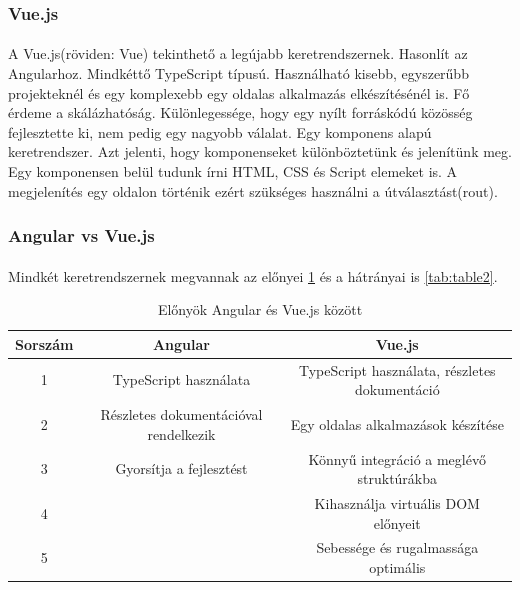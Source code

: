 \documentclass{article}
\begin{document}
	\subsubsection{Vue.js}
	\paragraph{}
	A Vue.js(röviden: Vue) tekinthető a legújabb keretrendszernek. Hasonlít az Angularhoz. Mindkéttő TypeScript típusú. Használható kisebb, egyszerűbb projekteknél és egy komplexebb egy oldalas alkalmazás elkészítésénél is. Fő érdeme a skálázhatóság. Különlegessége, hogy egy nyílt forráskódú közösség fejlesztette ki, nem pedig egy nagyobb válalat. Egy komponens alapú keretrendszer. Azt jelenti, hogy komponenseket különböztetünk és jelenítünk meg. Egy komponensen belül tudunk írni HTML, CSS és Script elemeket is. A megjelenítés egy oldalon történik ezért szükséges használni a útválasztást(rout).\cite{wohlgethan2018supportingweb}
	
	\subsubsection{Angular vs Vue.js}
	\paragraph{}
	Mindkét keretrendszernek megvannak az előnyei \ref{tab:table1} és a hátrányai is \ref{tab:table2}. 
	\begin{table}
		\begin{center}
			\caption{Előnyök Angular és Vue.js között \cite{vuevsang} }
			\label{tab:table1}
			\begin{tabular}{c|c|c} 
				\textbf{Sorszám} & \textbf{Angular} & \textbf{Vue.js}\\
				\hline
				1 & TypeScript használata & TypeScript használata, részletes dokumentáció\\
				\hline
				2 & Részletes dokumentációval rendelkezik & Egy oldalas alkalmazások készítése \\
				\hline
				3 & Gyorsítja a fejlesztést & Könnyű integráció a meglévő struktúrákba \\
				\hline
				4 & & Kihasználja virtuális DOM előnyeit \\
				\hline
				5 & & Sebessége és rugalmassága optimális \\
			\end{tabular}
		\end{center}
	\end{table}
\end{document}
